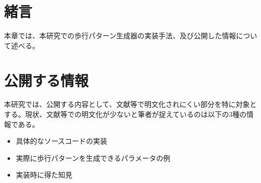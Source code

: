 \section{緒言}
本章では、本研究での歩行パターン生成器の実装手法、及び公開した情報について述べる。

\section{公開する情報}
本研究では、公開する内容として、文献等で明文化されにくい部分を特に対象とする。現状、文献等での明文化が少ないと筆者が捉えているのは以下の3種の情報である。
\begin{itemize}
  \item 具体的なソースコードの実装
  \item 実際に歩行パターンを生成できるパラメータの例
  \item 実装時に得た知見
\end{itemize}